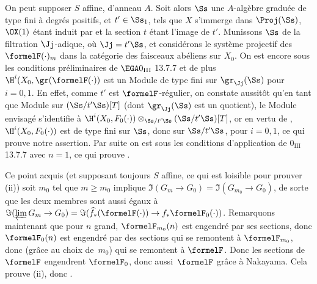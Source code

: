 On peut supposer $S$ affine, d'anneau $A$. Soit alors $\Ss$ une $A$-alg\`ebre gradu\'ee de type fini \`a degr\'es positifs, et $t'\in\Ss_1$, tels que $X$ s'immerge dans $\Proj(\Ss)$, $\OX(1)$ \'etant induit par  et la section $t$ \'etant l'image de $t'$. Munissons $\Ss$ de la filtration $\Jj$-adique, o\`u $\Jj=t'\Ss$, et consid\'erons le syst\`eme projectif des $\formelF(\cdot)_m$ dans la cat\'egorie des faisceaux ab\'eliens sur $X_0$. On est encore sous les conditions pr\'eliminaires de $\EGA 0_{\textup{III}}$ 13.7.7 et de plus $\H^i(X_0, \gr(\formelF(\cdot))$ est un Module de type fini sur $\gr_\Jj(\Ss)$ pour $i=0, 1$. En effet, comme $t'$ est $\formelF$-r\'egulier, on constate aussit\^{o}t qu'en tant que Module sur $(\Ss /t'\Ss)[T]$ (dont $\gr_\Jj(\Ss)$ est un quotient), le Module envisag\'e s'identifie \`a $\H^i(X_0, F_0(\cdot))\otimes_{\Ss /t'\Ss}(\Ss /t'\Ss)[T]$, or en vertu de , $\H^i(X_0, F_0(\cdot))$ est de type fini sur $\Ss$, donc sur $\Ss /t'\Ss$, pour $i=0, 1$, ce qui prouve notre assertion. Par suite on est sous les conditions d'application de $0_{\text{III}}$ 13.7.7 avec $n=1$, ce qui prouve .

Ce point acquis (et supposant toujours $S$ affine, ce qui est loisible pour prouver  (ii)) soit $m_0$ tel que $m\geq m_0$ implique $\Im(G_m\to G_0)= \Im(G_{m_0}\to G_0)$, de sorte que les deux membres sont aussi \'egaux \`a $\Im(\varprojlim G_m\to G_0) = \Im(\widehat{f}_\ast(\formelF(\cdot))\to f_\ast\formelF_0(\cdot))$. Remarquons maintenant que pour $n$ grand, $\formelF_{m_0}(n)$ est engendr\'e par ses sections, donc $\formelF_0(n)$ est engendr\'e par des sections qui se remontent \`a $\formelF_{m_0}$, donc (gr\^ace au choix de~$m_0$) qui se remontent \`a $\formelF$. Donc les sections de $\formelF$ engendrent $\formelF_0$, donc aussi~$\formelF$ gr\^ace \`a Nakayama. Cela prouve  (ii), donc .

